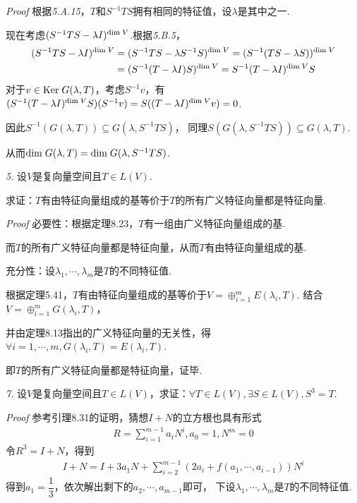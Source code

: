 \textit{Proof}
根据\textit{5.A.15}，\(T\)和\(S^{-1}TS\)拥有相同的特征值，设\(\lambda\)是其中之一.

现在考虑\((S^{-1}TS-\lambda I)^{\mathrm{dim \;} V}\).根据\textit{5.B.5}，
    \begin{align*}
        (S^{-1}TS-\lambda I)^{\mathrm{dim \;} V}&=(S^{-1}TS-\lambda S^{-1}S)^{\mathrm{dim \;} V}=(S^{-1}(TS-\lambda S))^{\mathrm{dim \;} V} \\
        &=(S^{-1}(T-\lambda I)S)^{\mathrm{dim \;} V}=S^{-1}(T-\lambda I)^{\mathrm{dim \;} V}S
    \end{align*}
对于\(v \in \mathrm{Ker \;} G(\lambda,T)\)，考虑\(S^{-1}v\)，有
\((S^{-1}(T-\lambda I)^{\mathrm{dim \;} V}S)(S^{-1}v)=S((T-\lambda I)^{\mathrm{dim \;} V}v)=0\).

因此\(S^{-1}(G(\lambda,T)) \subseteq G(\lambda,S^{-1}TS)\)，
同理\(S(G(\lambda,S^{-1}TS)) \subseteq G(\lambda,T)\).

从而\(\mathrm{dim \;} G(\lambda,T)=\mathrm{dim \;} G(\lambda,S^{-1}TS)\).

\hspace*{\fill}

\textit{5.}
设\(V\)是复向量空间且\(T \in L(V)\).

求证：\(T\)有由特征向量组成的基等价于\(T\)的所有广义特征向量都是特征向量.

\textit{Proof}
必要性：根据定理8.23，\(T\)有一组由广义特征向量组成的基.

而\(T\)的所有广义特征向量都是特征向量，从而\(T\)有由特征向量组成的基.

充分性：设\(\lambda_1,\cdots,\lambda_m\)是\(T\)的不同特征值.

根据定理5.41，\(T\)有由特征向量组成的基等价于\(V=\oplus_{i=1}^m E(\lambda_i,T)\).
结合\(V=\oplus_{i=1}^m G(\lambda_i,T)\)，

并由定理8.13指出的广义特征向量的无关性，得\(\forall i=1,\cdots,m,G(\lambda_i,T)=E(\lambda_i,T)\).

即\(T\)的所有广义特征向量都是特征向量，证毕.

\hspace*{\fill}

\textit{7.}
设\(V\)是复向量空间且\(T \in L(V)\)，求证：\(\forall T \in L(V),\exists S \in L(V),S^3=T\).

\textit{Proof}
参考引理8.31的证明，猜想\(I+N\)的立方根也具有形式
    \begin{align*}
        R=\sum_{i=1}^{m-1} a_iN^i,a_0=1,N^m=0
    \end{align*}
令\(R^3=I+N\)，得到
    \begin{align*}
        I+N=I+3a_1N+\sum_{i=2}^{m-1} (2a_i+f(a_1,\cdots,a_{i-1}))N^i
    \end{align*}
得到\(a_1=\dfrac{1}{3}\)，依次解出剩下的\(a_2,\cdots,a_{m-1}\)即可，
下设\(\lambda_1,\cdots,\lambda_m\)是\(T\)的不同特征值.

